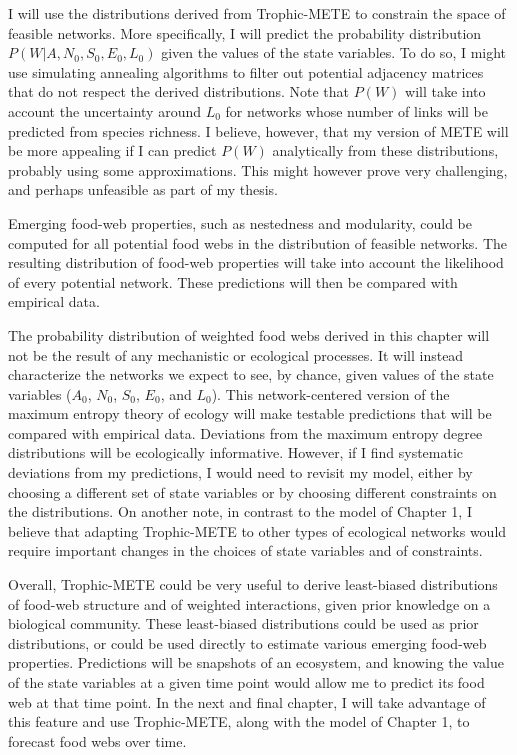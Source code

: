 I will use the distributions derived from Trophic-METE to constrain the space of
feasible networks. More specifically, I will predict the probability
distribution $P(W|A, N_0, S_0, E_0, L_0)$ given the values of the state
variables. To do so, I might use simulating annealing algorithms to filter out
potential adjacency matrices that do not respect the derived distributions. Note
that $P(W)$ will take into account the uncertainty around $L_0$ for networks
whose number of links will be predicted from species richness. I believe,
however, that my version of METE will be more appealing if I can predict $P(W)$
analytically from these distributions, probably using some approximations. This
might however prove very challenging, and perhaps unfeasible as part of my
thesis.

Emerging food-web properties, such as nestedness and modularity, could be
computed for all potential food webs in the distribution of feasible networks.
The resulting distribution of food-web properties will take into account the
likelihood of every potential network. These predictions will then be compared
with empirical data.

The probability distribution of weighted food webs derived in this chapter will
not be the result of any mechanistic or ecological processes. It will instead
characterize the networks we expect to see, by chance, given values of the state
variables ($A_0$, $N_0$, $S_0$, $E_0$, and $L_0$). This network-centered version
of the maximum entropy theory of ecology will make testable predictions that
will be compared with empirical data. Deviations from the maximum entropy degree
distributions will be ecologically informative. However, if I find systematic
deviations from my predictions, I would need to revisit my model, either by
choosing a different set of state variables or by choosing different constraints
on the distributions. On another note, in contrast to the model of Chapter 1, I
believe that adapting Trophic-METE to other types of ecological networks would
require important changes in the choices of state variables and of constraints.

Overall, Trophic-METE could be very useful to derive least-biased distributions
of food-web structure and of weighted interactions, given prior knowledge on a
biological community. These least-biased distributions could be used as prior
distributions, or could be used directly to estimate various emerging food-web
properties. Predictions will be snapshots of an ecosystem, and knowing the value
of the state variables at a given time point would allow me to predict its food
web at that time point. In the next and final chapter, I will take advantage of
this feature and use Trophic-METE, along with the model of Chapter 1, to
forecast food webs over time.

